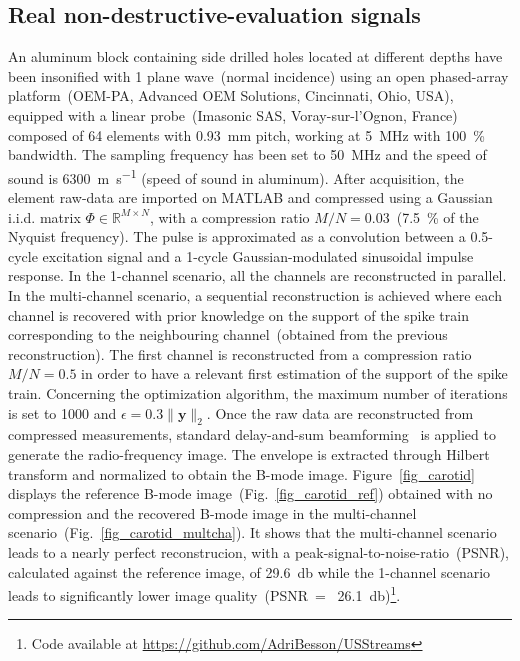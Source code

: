 \documentclass{article}
\newcommand{\vect}[1]{\bm{#1}}
\newcommand{\mat}[1]{\mathsf{#1}}
\theoremstyle{definition}
\begin{document}
\subsection{Real non-destructive-evaluation signals}
\label{subsec_invivo_images}
An aluminum block containing side drilled holes located at different depths have been insonified with 1 plane wave~(normal incidence) using an open phased-array platform~(OEM-PA, Advanced OEM Solutions, Cincinnati, Ohio, USA), equipped with a linear probe~(Imasonic SAS, Voray-sur-l'Ognon, France) composed of \num{64} elements with \SI{0.93}{\milli\metre} pitch, working at \SI{5}{\mega\hertz} with \SI{100}{\percent} bandwidth. The sampling frequency has been set to \SI{50}{\mega\hertz} and the speed of sound is \SI{6300}{\meter\per\second} (speed of sound in aluminum). 
After acquisition, the element raw-data are imported on MATLAB and compressed using a Gaussian i.i.d. matrix $\mat{\Phi} \in \mathbb{R}^{M \times N}$, with a compression ratio $M/N = 0.03$~(\SI{7.5}{\percent} of the Nyquist frequency). The pulse is approximated as a convolution between a \num{0.5}-cycle excitation signal and a \num{1}-cycle Gaussian-modulated sinusoidal impulse response. 
In the 1-channel scenario, all the channels are reconstructed in parallel. In the multi-channel scenario, a sequential reconstruction is achieved where each channel is recovered with prior knowledge on the support of the spike train corresponding to the neighbouring channel~(obtained from the previous reconstruction). The first channel is reconstructed from a compression ratio $M/N = 0.5$ in order to have a relevant first estimation of the support of the spike train. Concerning the optimization algorithm, the maximum number of iterations is set to \num{1000} and $\epsilon = 0.3 \| \vect{y} \|_2$. 
Once the raw data are reconstructed from compressed measurements, standard delay-and-sum beamforming~\cite{montaldo_uffc_2014} is applied to generate the radio-frequency image. The envelope is extracted through Hilbert transform and normalized to obtain the B-mode image. 
Figure~\ref{fig_carotid} displays the reference B-mode image~(Fig.~\ref{fig_carotid_ref}) obtained with no compression and the recovered B-mode image in the multi-channel scenario~(Fig.~\ref{fig_carotid_multcha}). It shows that the multi-channel scenario leads to a nearly perfect reconstrucion, with a peak-signal-to-noise-ratio~(PSNR), calculated against the reference image, of \SI{29.6}{\decibel} while the \num{1}-channel scenario leads to significantly lower image quality~(PSNR~=~ \SI{26.1}{\decibel})\footnote{Code available at \url{https://github.com/AdriBesson/USStreams}}.
\end{document}
